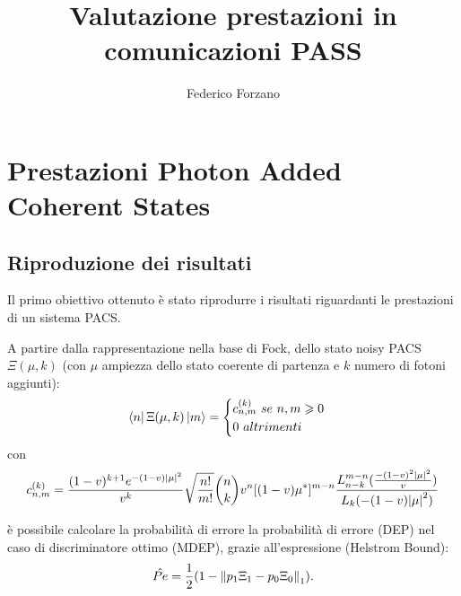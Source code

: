 \documentclass[a4paper,11pt]{article}
\begin{document}
    \author{Federico Forzano}
    \title{Valutazione prestazioni in comunicazioni PASS}
    \maketitle

    \section{Prestazioni \foreignlanguage{english}{Photon Added Coherent States}}
        \subsection{Riproduzione dei risultati}
        Il primo obiettivo ottenuto è stato riprodurre i risultati 
        riguardanti le prestazioni di un sistema PACS.

        A partire dalla rappresentazione nella base di Fock, dello stato noisy PACS 
        $\Xi(\mu,k)$ (con $\mu$ ampiezza dello stato coerente di partenza e $k$ numero di 
        fotoni aggiunti):
        \begin{equation}
            \bra{n}\Xi(\mu,k)\ket{m}=
            \begin{cases}
                c_{n,m}^{(k)}\ se\ n,m\geqslant0\\
                0\ altrimenti
            \end{cases}
        \end{equation}
        con
        \begin{equation}
            c_{n,m}^{(k)}=\frac{(1-v)^{k+1}e^{-(1-v)\absolutevalue{\mu}^{2}}}
            {v^k}\sqrt{\frac{n!}{m!}}\binom{n}{k}v^n[(1-v)\mu^*]^{m-n}
            \frac{L_{n-k}^{m-n}(\frac{-(1-v)^2\absolutevalue{\mu}^{2}}{v})}{L_k(-(1-v)\absolutevalue{\mu}^{2})}
        \end{equation}

        è possibile calcolare la probabilità di errore la probabilità di errore (DEP)
        nel caso di discriminatore ottimo (MDEP), grazie all'espressione (Helstrom Bound):
        \begin{equation}
            \hat{Pe}=\frac{1}{2}(1-\norm{p_1\Xi_1-p_0\Xi_0}_1).
            \label{eq:3}
        \end{equation}
\end{document}

